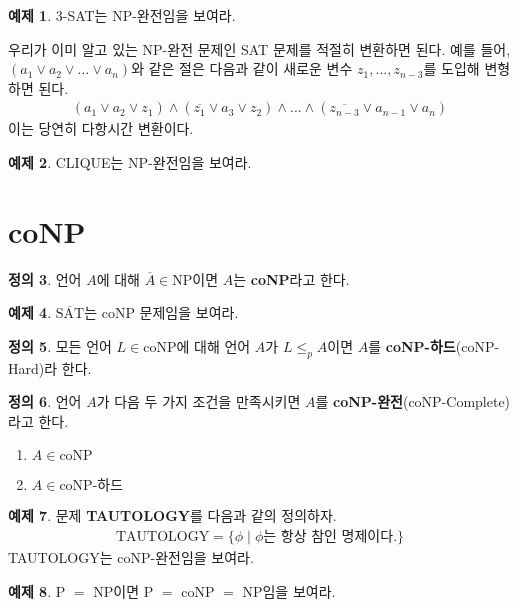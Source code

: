 \documentclass[b5paper, 11pt]{book}
\theoremstyle{definition}
\newtheorem{defn}{정의}[chapter]
\newtheorem{ex}[defn]{예제}
\newenvironment{pf*}{\pushQED{\qed}\pf}
{\popQED\endpf}
\begin{document}
\begin{ex}
    3-SAT는 NP-완전임을 보여라.
    \begin{pf*}
        우리가 이미 알고 있는 NP-완전 문제인 SAT 문제를 적절히 변환하면 된다. 예를 들어, $(a_1 \vee a_2 \vee \ldots \vee a_n)$와
        같은 절은 다음과 같이 새로운 변수 $z_1, \ldots, z_{n-3}$를 도입해 변형하면 된다.
        \begin{align*}
            (a_1 \vee a_2 \vee z_1) \wedge (\overline{z_1} \vee a_3 \vee z_2) \wedge \ldots \wedge (\overline{z_{n-3}} \vee a_{n-1} \vee a_{n})
        \end{align*}
        이는 당연히 다항시간 변환이다.
    \end{pf*}
\end{ex}
\begin{ex}
    CLIQUE는 NP-완전임을 보여라.
\end{ex}
\section{coNP}
\begin{defn}
    언어 $A$에 대해 $\overline{A} \in \text{NP}$이면 $A$는 \textbf{coNP}라고 한다.   
\end{defn}
\begin{ex}
    $\overline{\text{SAT}}$는 coNP 문제임을 보여라.
\end{ex}
\begin{defn}
    모든 언어 $L \in \text{coNP}$에 대해 언어 $A$가 $L \le_p A$이면 $A$를 
    \textbf{coNP-하드}(coNP-Hard)라 한다.
\end{defn}
\begin{defn}
    언어 $A$가 다음 두 가지 조건을 만족시키면 $A$를 \textbf{coNP-완전}(coNP-Complete)라고 한다.
    \begin{enumerate}
        \item $A \in \text{coNP}$
        \item $A \in \text{coNP-하드}$
    \end{enumerate}
\end{defn}
\begin{ex}
    문제 \textbf{TAUTOLOGY}를 다음과 같의 정의하자. 
    \begin{align*}
        \text{TAUTOLOGY} = \{ \phi \;\vert\; \phi \text{는 항상 참인 명제이다.}\}
    \end{align*}
    TAUTOLOGY는 coNP-완전임을 보여라.
\end{ex}
\begin{ex}
    P $=$ NP이면 P $=$ coNP $=$ NP임을 보여라.
\end{ex}
\end{document}
